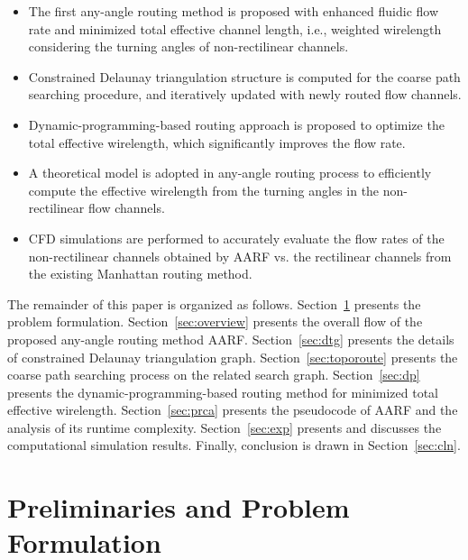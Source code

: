 \documentclass[journal]{IEEEtran}
\begin{document}
\begin{itemize}
\item The first any-angle routing method is proposed with enhanced fluidic flow rate and 
minimized total effective channel length, i.e., weighted wirelength considering the turning angles of non-rectilinear channels.
\item Constrained Delaunay triangulation structure is computed for the coarse path searching procedure, and iteratively updated with newly routed flow channels.

\item Dynamic-programming-based routing approach is proposed to optimize the total effective wirelength, which significantly improves the flow rate.
\item A theoretical model is adopted in any-angle routing process to efficiently compute the effective wirelength from the turning angles in the non-rectilinear flow channels. 
\item CFD simulations are performed to accurately evaluate the flow rates 
of the non-rectilinear channels obtained by AARF vs. the rectilinear channels from the 
existing Manhattan routing method.
\end{itemize}

The remainder of this paper is organized as follows. 
Section~\ref{sec:formulation} presents the problem formulation. 
Section~\ref{sec:overview} presents the overall flow of the proposed any-angle routing method AARF. 
Section~\ref{sec:dtg} presents the details of constrained Delaunay triangulation graph.
Section~\ref{sec:toporoute} presents the coarse path searching process on the related search graph.
Section~\ref{sec:dp} presents the dynamic-programming-based routing method for minimized total effective wirelength.
Section~\ref{sec:prca} presents the pseudocode of AARF and the analysis of its runtime complexity.
Section~\ref{sec:exp} presents and discusses the computational simulation results. 
Finally, conclusion is drawn in Section~\ref{sec:cln}.

\section{Preliminaries and Problem Formulation}
\label{sec:formulation}
\end{document}
